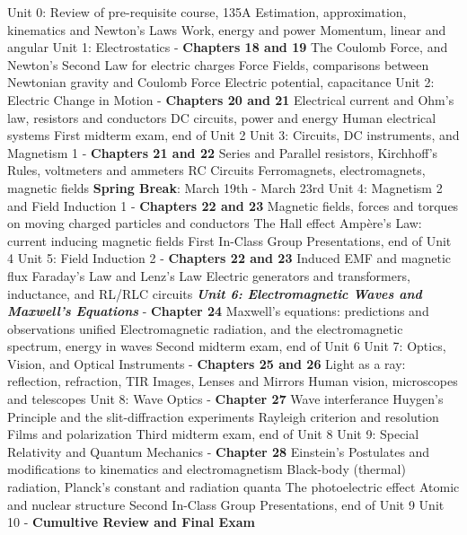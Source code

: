 \documentclass[10pt]{article}
\begin{document}
\begin{outline}[enumerate]
\1 Unit 0: Review of pre-requisite course, 135A
\2 Estimation, approximation, kinematics and Newton's Laws
\2 Work, energy and power
\2 Momentum, linear and angular
\1 Unit 1: Electrostatics - \textbf{Chapters 18 and 19}
\2 The Coulomb Force, and Newton's Second Law for electric charges
\2 Force Fields, comparisons between Newtonian gravity and Coulomb Force
\2 Electric potential, capacitance
\1 Unit 2: Electric Change in Motion - \textbf{Chapters 20 and 21}
\2 Electrical current and Ohm's law, resistors and conductors
\2 DC circuits, power and energy
\2 Human electrical systems
\1 First midterm exam, end of Unit 2
\1 Unit 3: Circuits, DC instruments, and Magnetism 1 - \textbf{Chapters 21 and 22}
\2 Series and Parallel resistors, Kirchhoff's Rules, voltmeters and ammeters
\2 RC Circuits
\2 Ferromagnets, electromagnets, magnetic fields
\1 \textbf{Spring Break}: March 19th - March 23rd
\1 Unit 4: Magnetism 2 and Field Induction 1 - \textbf{Chapters 22 and 23}
\2 Magnetic fields, forces and torques on moving charged particles and conductors
\2 The Hall effect
\2 Amp\`{e}re's Law: current inducing magnetic fields
\1 First In-Class Group Presentations, end of Unit 4
\1 Unit 5: Field Induction 2 - \textbf{Chapters 22 and 23}
\2 Induced EMF and magnetic flux
\2 Faraday's Law and Lenz's Law
\2 Electric generators and transformers, inductance, and RL/RLC circuits
\1 \textit{\textbf{ Unit 6: Electromagnetic Waves and Maxwell's Equations}} - \textbf{Chapter 24}
\2 Maxwell's equations: predictions and observations unified
\2 Electromagnetic radiation, and the electromagnetic spectrum, energy in waves
\1 Second midterm exam, end of Unit 6
\1 Unit 7: Optics, Vision, and Optical Instruments - \textbf{Chapters 25 and 26}
\2 Light as a ray: reflection, refraction, TIR
\2 Images, Lenses and Mirrors
\2 Human vision, microscopes and telescopes
\1 Unit 8: Wave Optics - \textbf{Chapter 27}
\2 Wave interferance
\2 Huygen's Principle and the slit-diffraction experiments
\2 Rayleigh criterion and resolution
\2 Films and polarization
\1 Third midterm exam, end of Unit 8
\1 Unit 9: Special Relativity and Quantum Mechanics - \textbf{Chapter 28}
\2 Einstein's Postulates and modifications to kinematics and electromagnetism
\2 Black-body (thermal) radiation, Planck's constant and radiation quanta
\2 The photoelectric effect
\2 Atomic and nuclear structure
\1 Second In-Class Group Presentations, end of Unit 9
\1 Unit 10 - \textbf{Cumultive Review and Final Exam}
\end{outline}
\end{document}
